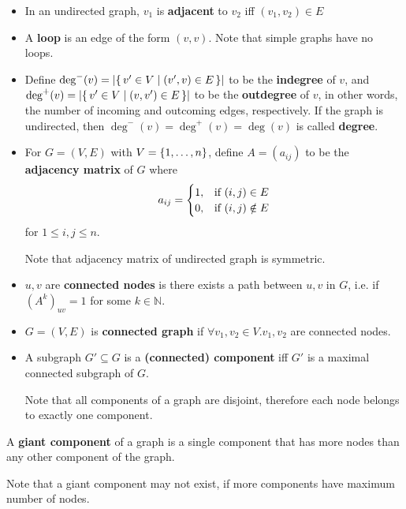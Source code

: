 \begin{definition}
    \begin{itemize}[leftmargin=*]
        \item In an undirected graph, $v_1$ is \textbf{adjacent} to $v_2$ iff $(v_1, v_2) \in E$
        \item A \textbf{loop} is an edge of the form $(v, v)$.
        Note that simple graphs have no loops.
        \item Define $\deg^-(v) = \left\lvert \left\{\, v' \in V \mid (v', v) \in E \, \right\} \right\rvert$ to be the \textbf{indegree} of $v$, and $\deg^+(v) = \left\lvert \left\{\, v' \in V \mid (v, v') \in E \, \right\} \right\rvert$ to be the \textbf{outdegree} of $v$, in other words, the number of incoming and outcoming edges, respectively.
        If the graph is undirected, then $\deg^-(v) = \deg^+(v) = \deg(v)$ is called \textbf{degree}.
        \item For $G = (V, E)$ with $V = \left\{1, \dots, n\right\}$, define $A = (a_{ij})$ to be the \textbf{adjacency matrix} of $G$ where
        \[ a_{ij} = \begin{cases}
                        1, & \textnormal{if}\ (i, j) \in E \\
                        0, & \textnormal{if}\ (i, j) \notin E
        \end{cases} \]
        for $1 \leq i, j \leq n$.

        Note that adjacency matrix of undirected graph is symmetric.
    \end{itemize}
\end{definition}

\begin{definition}[Connectedness]
    \begin{itemize}[leftmargin=*]
        \item $u, v$ are \textbf{connected nodes} is there exists a path between $u, v$ in $G$, i.e. if $(A^k)_{uv} = 1$ for some $k\in \mathbb{N}$.
        \item $G = (V, E)$ is \textbf{connected graph} if $\forall v_1, v_2 \in V. v_1, v_2$ are connected nodes.
        \item A subgraph $G' \subseteq G$ is a \textbf{(connected) component} iff $G'$ is a maximal connected subgraph of $G$.

        Note that all components of a graph are disjoint, therefore each node belongs to exactly one component.
    \end{itemize}

    \item A \textbf{giant component} of a graph is a single component that has more nodes than any other component of the graph.

    Note that a giant component may not exist, if more components have maximum number of nodes.
\end{definition}

